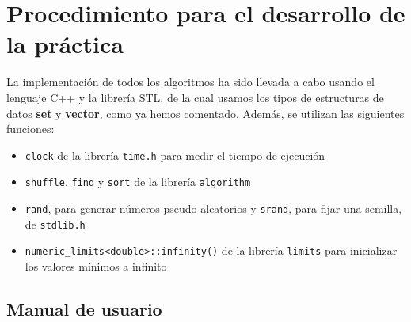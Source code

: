 \documentclass[10pt,a4paper]{article}
\begin{document}
\newpage
	\section{Procedimiento para el desarrollo de la práctica}
	
	La implementación de todos los algoritmos ha sido llevada a cabo usando el lenguaje C++ y la librería STL, de la cual usamos los tipos de estructuras de datos \textbf{set} y \textbf{vector}, como ya hemos comentado. Además, se utilizan las siguientes funciones:
	\begin{itemize}
		\item \lstinline|clock| de la librería \lstinline|time.h| para medir el tiempo de ejecución
		\item  \lstinline|shuffle|, \lstinline|find| y \lstinline|sort|  de la librería \lstinline|algorithm|
		\item \lstinline|rand|, para generar números pseudo-aleatorios y \lstinline|srand|, para fijar una semilla, de \lstinline|stdlib.h|
		\item  \lstinline|numeric_limits<double>::infinity()| de la librería \lstinline|limits| para inicializar los valores mínimos a infinito
	\end{itemize} 


	\subsection{Manual de usuario}
	
\end{document}
